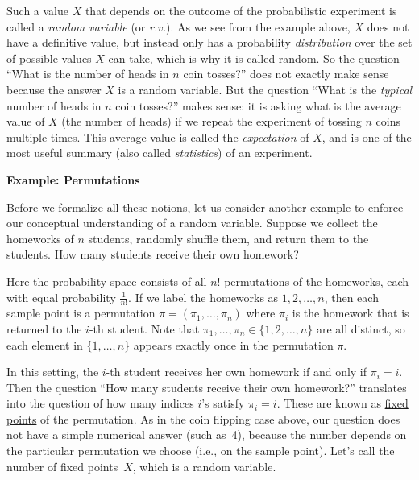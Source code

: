 \documentclass[11pt]{article}
\def\ul#1{\underline{#1}}
\begin{document}
Such a value $X$ that depends on the outcome of the probabilistic experiment is called
a {\em random variable} (or {\em r.v.}). As we see from the example above, $X$ does not have a definitive value, but
instead only has a probability {\em distribution} over the set of possible values $X$ can take, which is why
it is called random. So the question ``What is the number of heads in $n$ coin tosses?'' does not exactly
make sense because the answer $X$ is a random variable. But the question
``What is the {\em typical} number of heads in $n$ coin tosses?'' makes sense: it is asking what is the 
average value of $X$ (the number of heads) if we repeat the experiment of tossing $n$ coins
multiple times. This average value is called the {\em expectation} of $X$, and is one of the most useful summary
(also called {\em statistics}) of an experiment.
 
\smallskip

{\bf Example: Permutations}

\smallskip

Before we formalize all these notions, let us consider another example to enforce our
conceptual understanding of a random variable. Suppose we collect the homeworks
of $n$ students, randomly shuffle them, and return them to the students. How many students
receive their own homework?

Here the probability space consists of all $n!$ permutations of the homeworks,
each with equal probability $\frac{1}{n!}$. If we label the homeworks as $1,2,\dots,n$,
then each sample point is a permutation $\pi = (\pi_1,\dots,\pi_n)$ where $\pi_i$ is
the homework that is returned to the $i$-th student. Note that $\pi_1,\dots,\pi_n \in \{1,2,\dots,n\}$
are all distinct, so each element in $\{1,\dots,n\}$ appears exactly once in the permutation $\pi$.

In this setting, the $i$-th student receives her own homework if and only if $\pi_i = i$. Then the
question ``How many students receive their own homework?'' translates into the question
of how many indices $i$'s satisfy $\pi_i = i$. These are known as \ul{fixed points} of the permutation.
As in the coin flipping case above, our question does not have a simple numerical answer
(such as~4), because the number depends on the particular permutation we choose (i.e., on the sample point).
Let's call the number of fixed points~$X$, which is a random variable.
\end{document}
